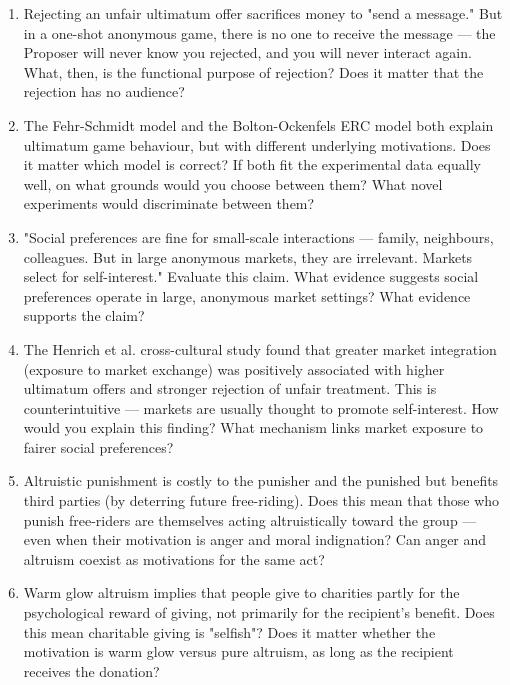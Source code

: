 \documentclass[12pt, letterpaper]{article}
\begin{document}
\begin{enumerate}
\item Rejecting an unfair ultimatum offer sacrifices money to "send a message." But in a one-shot anonymous game, there is no one to receive the message --- the Proposer will never know you rejected, and you will never interact again. What, then, is the functional purpose of rejection? Does it matter that the rejection has no audience?

\item The Fehr-Schmidt model and the Bolton-Ockenfels ERC model both explain ultimatum game behaviour, but with different underlying motivations. Does it matter which model is correct? If both fit the experimental data equally well, on what grounds would you choose between them? What novel experiments would discriminate between them?

\item "Social preferences are fine for small-scale interactions --- family, neighbours, colleagues. But in large anonymous markets, they are irrelevant. Markets select for self-interest." Evaluate this claim. What evidence suggests social preferences operate in large, anonymous market settings? What evidence supports the claim?

\item The Henrich et al. cross-cultural study found that greater market integration (exposure to market exchange) was positively associated with higher ultimatum offers and stronger rejection of unfair treatment. This is counterintuitive --- markets are usually thought to promote self-interest. How would you explain this finding? What mechanism links market exposure to fairer social preferences?

\item Altruistic punishment is costly to the punisher and the punished but benefits third parties (by deterring future free-riding). Does this mean that those who punish free-riders are themselves acting altruistically toward the group --- even when their motivation is anger and moral indignation? Can anger and altruism coexist as motivations for the same act?

\item Warm glow altruism implies that people give to charities partly for the psychological reward of giving, not primarily for the recipient's benefit. Does this mean charitable giving is "selfish"? Does it matter whether the motivation is warm glow versus pure altruism, as long as the recipient receives the donation?


\end{enumerate}
\end{document}
